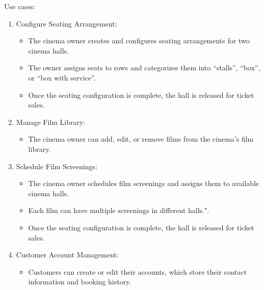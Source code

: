 \label{apx:ch:extended-analysis}

\label{apx:sec:use-cases}

Use cases:

\begin{enumerate}
    \item Configure Seating Arrangement:
    \begin{itemize}
        \item The cinema owner creates and configures seating arrangements for two cinema halls.
        \item The owner assigns seats to rows and categorizes them into \enquote{stalls}, \enquote{box}, or \enquote{box with service}.
        \item Once the seating configuration is complete, the hall is released for ticket sales.
    \end{itemize}
    
    \item Manage Film Library:
    \begin{itemize}
        \item The cinema owner can add, edit, or remove films from the cinema's film library.
    \end{itemize}
    
    \item Schedule Film Screenings:
    \begin{itemize}
        \item The cinema owner schedules film screenings and assigns them to available cinema halls.
        \item Each film can have multiple screenings in different halls.".
        \item Once the seating configuration is complete, the hall is released for ticket sales.
    \end{itemize}
    
    \item Customer Account Management:
    \begin{itemize}
        \item Customers can create or edit their accounts, which store their contact information and booking history.
    \end{itemize}
    

\end{enumerate}
